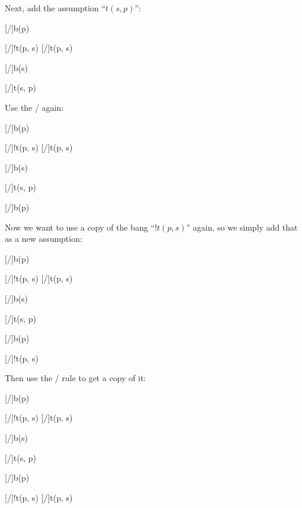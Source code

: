 \documentclass[../../../main.tex]{subfiles}
\begin{document}
 \noindent
 Next, add the assumption ``$t(s, p)$'':
 
\begin{prooftree*}
  \hypo{}
  [\startrule/]{b(p)}

  \hypo{}
  [\startrule/]{!t(p, s)}
  [\bangCopy/]{t(p, s)}

  [\traderule/]{b(s)}

  \hypo{}
  [\startrule/]{t(s, p)}


\end{prooftree*}
 
\noindent
Use the \traderule/ again:

\begin{prooftree*}
  \hypo{}
  [\startrule/]{b(p)}
  
  \hypo{}
  [\startrule/]{!t(p, s)}
  [\bangCopy/]{t(p, s)}
  
  [\traderule/]{b(s)}
  
  \hypo{}
  [\startrule/]{t(s, p)}
  
  [\traderule/]{b(p)}

\end{prooftree*} 

\noindent
Now we want to use a copy of the bang ``$!t(p, s)$'' again, so we simply add that as a new assumption:


\begin{prooftree*}
  \hypo{}
  [\startrule/]{b(p)}
  
  \hypo{}
  [\startrule/]{!t(p, s)}
  [\bangCopy/]{t(p, s)}
  
  [\traderule/]{b(s)}
  
  \hypo{}
  [\startrule/]{t(s, p)}
  
  [\traderule/]{b(p)}

  \hypo{}
  [\startrule/]{!t(p, s)}


\end{prooftree*}

\noindent
Then use the \bangCopy/ rule to get a copy of it:

\begin{prooftree*}
  \hypo{}
  [\startrule/]{b(p)}
  
  \hypo{}
  [\startrule/]{!t(p, s)}
  [\bangCopy/]{t(p, s)}
  
  [\traderule/]{b(s)}
  
  \hypo{}
  [\startrule/]{t(s, p)}
  
  [\traderule/]{b(p)}

  \hypo{}
  [\startrule/]{!t(p, s)}
  [\bangCopy/]{t(p, s)}


\end{prooftree*}
\end{document}
